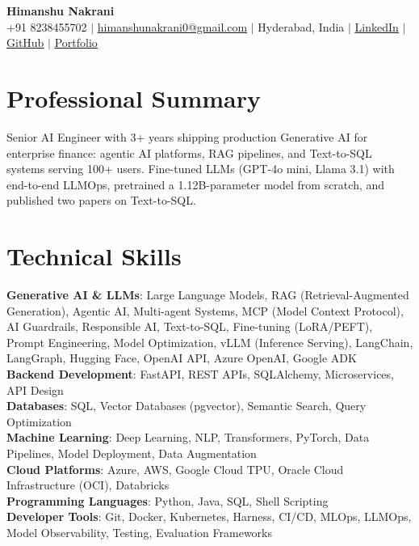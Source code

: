 \documentclass[letterpaper,11pt]{article}
\begin{document}
    \begin{center}
        \textbf{\Huge Himanshu Nakrani} \\ \vspace{1pt}
        \small +91 8238455702 $|$ \href{mailto:himanshunakrani0@gmail.com}{\underline{himanshunakrani0@gmail.com}} $|$
        Hyderabad, India $|$
        \href{https://www.linkedin.com/in/himanshu-nakrani/}{\underline{LinkedIn}} $|$
        \href{https://github.com/himanshu-nakrani}{\underline{GitHub}} $|$
        \href{https://www.himanshunakrani.me}{\underline{Portfolio}}
    \end{center}
    \section{Professional Summary}
    \small{Senior AI Engineer with 3+ years shipping production Generative AI for enterprise finance: agentic AI platforms, RAG pipelines, and Text-to-SQL systems serving 100+ users. Fine-tuned LLMs (GPT-4o mini, Llama 3.1) with end-to-end LLMOps, pretrained a 1.12B-parameter model from scratch, and published two papers on Text-to-SQL.}
    \section{Technical Skills}
    \begin{itemize}[leftmargin=0.15in, label={}]
        \small{\item{
        \textbf{Generative AI \& LLMs}{: Large Language Models, RAG (Retrieval-Augmented Generation), Agentic AI, Multi-agent Systems, MCP (Model Context Protocol), AI Guardrails, Responsible AI, Text-to-SQL, Fine-tuning (LoRA/PEFT), Prompt Engineering, Model Optimization, vLLM (Inference Serving), LangChain, LangGraph, Hugging Face, OpenAI API, Azure OpenAI, Google ADK} \\
        \textbf{Backend Development}{: FastAPI, REST APIs, SQLAlchemy, Microservices, API Design} \\
        \textbf{Databases}{: SQL, Vector Databases (pgvector), Semantic Search, Query Optimization} \\
        \textbf{Machine Learning}{: Deep Learning, NLP, Transformers, PyTorch, Data Pipelines, Model Deployment, Data Augmentation} \\
        \textbf{Cloud Platforms}{: Azure, AWS, Google Cloud TPU, Oracle Cloud Infrastructure (OCI), Databricks} \\
        \textbf{Programming Languages}{: Python, Java, SQL, Shell Scripting} \\
        \textbf{Developer Tools}{: Git, Docker, Kubernetes, Harness, CI/CD, MLOps, LLMOps, Model Observability, Testing, Evaluation Frameworks} \\
        }}
    \end{itemize}
\end{document}

